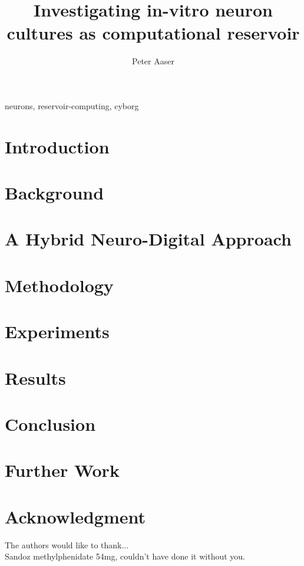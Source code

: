 \documentclass[journal]{IEEEtran}
\begin{document}
\title{Investigating in-vitro neuron cultures as computational reservoir}

\author{Peter Aaser}
%
\maketitle

\begin{abstract}
  \blindtext[2]

\end{abstract}

\begin{IEEEkeywords}
neurons, reservoir-computing, cyborg
\end{IEEEkeywords}

\section{Introduction}

\section{Background}

\section{A Hybrid Neuro-Digital Approach}

\section{Methodology}

\section{Experiments}

\section{Results}

\section{Conclusion}

\section{Further Work}



\section*{Acknowledgment}
The authors would like to thank...\\
Sandoz methylphenidate 54mg, couldn't have done it without you.


 

\end{document}
